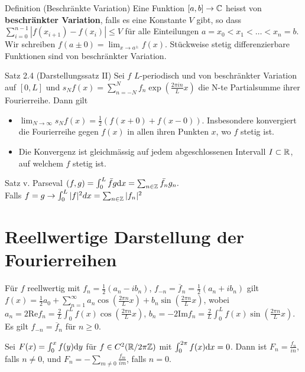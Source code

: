\begin{namedtheorem}{Definition (Beschränkte Variation)}
  Eine Funktion $[a,b]\rightarrow\mathbb{C}$ heisst von \textbf{beschränkter Variation}, falls es eine Konstante $V$ gibt, so dass $\sum_{i=0}^{n-1}|f(x_{i+1}) - f(x_i)| \leq V$ für alle Einteilungen $a=x_0<x_1<\ldots<x_n=b$. Wir schreiben $f(a\pm0) = \lim_{x\rightarrow a^{\pm}} f(x)$. Stückweise stetig differenzierbare Funktionen sind von beschränkter Variation.
\end{namedtheorem}

\begin{namedtheorem}{Satz 2.4 (Darstellungssatz II)}
  Sei $f$ $L$-periodisch und von beschränkter Variation auf $[0,L]$ und $s_Nf(x) = \sum_{n=-N}^N f_n \exp(\frac{2\pi in}{L}x)$ die N-te Partialsumme ihrer Fourierreihe. Dann gilt
  \begin{itemize}
    \item $\lim_{N\rightarrow\infty}s_N f(x) = \frac12(f(x+0) + f(x-0))$. Insbesondere konvergiert die Fourierreihe gegen $f(x)$ in allen ihren Punkten $x$, wo $f$ stetig ist.
    \item Die Konvergenz ist gleichmässig auf jedem abgeschlossenen Intervall $I\subset\mathbb{R}$, auf welchem $f$ stetig ist. 
  \end{itemize}
\end{namedtheorem}

\begin{namedtheorem}{Satz v. Parseval}
$(f,g)=\int^L_0\bar{f}g\mathrm{d} x=\sum_{n\in\mathbb{Z}}\bar{f_n}g_n.$\\
Falls $f=g\rightarrow \int^L_0|f|^2dx=\sum_{n\in\mathbb{Z}}|f_n|^2$
\end{namedtheorem}

\section{Reellwertige Darstellung der Fourierreihen}
Für $f$ reellwertig mit $f_n=\frac12(a_n-ib_n)$, $f_{-n}=\overline{f}_n=\frac12(a_n+ib_n)$ gilt $f(x) = \frac12 a_0 + \sum_{n=1}^{\infty}a_n\cos(\frac{2\pi n}{L}x) + b_n\sin(\frac{2\pi n}{L}x)$, wobei $a_n = 2 \mathrm{Re} f_n = \frac2{L} \int_0^L f(x)\cos\left(\frac{2\pi n}{L}x\right)$, $b_n = -2 \mathrm{Im} f_n = \frac2{L} \int_0^L f(x)\sin\left(\frac{2\pi n}{L}x\right)$. Es gilt $f_{-n}=\overline{f}_n$ für $n\geq 0$.


Sei $F(x)=\int_0^xf(y)\mathrm{d} y$ für $f\in C^2(\mathbb{R}/2\pi\mathbb{Z})$ mit $\int_0^{2\pi}f(x)\mathrm{d}x=0$. Dann ist $F_n=\frac{f_n}{in}$, falls $n\neq0$, und $F_n=-\sum_{m\neq0}\frac{f_m}{im}$, falls $n=0$.

